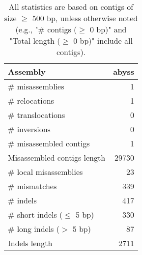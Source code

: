 \documentclass[12pt,a4paper]{article}
\begin{document}
\begin{table}[ht]
\begin{center}
\caption{All statistics are based on contigs of size $\geq$ 500 bp, unless otherwise noted (e.g., "\# contigs ($\geq$ 0 bp)" and "Total length ($\geq$ 0 bp)" include all contigs).}
\begin{tabular}{|l*{1}{|r}|}
\hline
Assembly & abyss \\ \hline
\# misassemblies & 1 \\ \hline
\hspace{5mm}\# relocations & 1 \\ \hline
\hspace{5mm}\# translocations & 0 \\ \hline
\hspace{5mm}\# inversions & 0 \\ \hline
\# misassembled contigs & 1 \\ \hline
Misassembled contigs length & 29730 \\ \hline
\# local misassemblies & 23 \\ \hline
\# mismatches & 339 \\ \hline
\# indels & 417 \\ \hline
\hspace{5mm}\# short indels ($\leq$ 5 bp) & 330 \\ \hline
\hspace{5mm}\# long indels ($>$ 5 bp) & 87 \\ \hline
Indels length & 2711 \\ \hline
\end{tabular}
\end{center}
\end{table}
\end{document}

